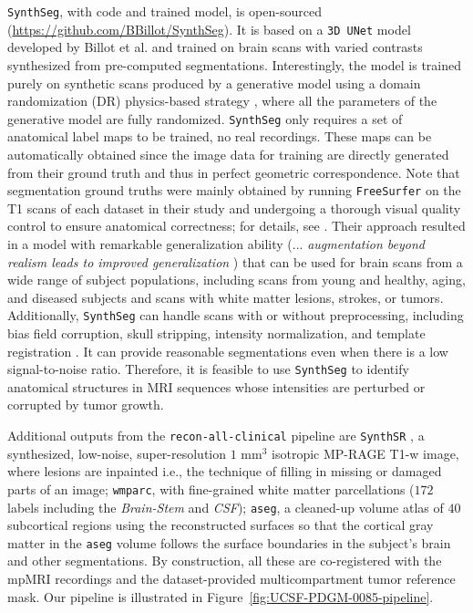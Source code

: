 \documentclass[a4paper,11pt,leqno]{article}
\begin{document}
\texttt{SynthSeg}, with code and trained model, is open-sourced
({\small \url{https://github.com/BBillot/SynthSeg}}). It is based on a \texttt{3D UNet}
model developed by Billot et al. \cite{Billot2020} %
and trained on brain scans with
varied contrasts synthesized from pre-computed segmentations.
Interestingly, the model is trained purely on synthetic scans produced
by a generative model using a domain randomization (DR)
physics-based strategy \cite{Tobin2017}, %
where all the parameters of the generative
model are fully randomized. \texttt{SynthSeg} only requires a set of anatomical
label maps to be trained, no real recordings. These maps can be
automatically obtained since the image data for training are directly
generated from their ground truth and thus in perfect geometric
correspondence. Note that segmentation ground truths were mainly
obtained by running \texttt{FreeSurfer} on the T1 scans of each dataset in their
study and undergoing a thorough visual quality control to ensure
anatomical correctness; for details, see \cite{Billot2023a}. %
Their approach resulted in a model with remarkable generalization
ability (... \emph{augmentation beyond realism leads to improved
generalization} \cite{Bengio2011}) %
that can be used for brain scans
from a wide range of subject populations, including scans from young and
healthy, aging, and diseased subjects and scans with white matter
lesions, strokes, or tumors. Additionally, \texttt{SynthSeg} can handle scans
with or without preprocessing, including bias field corruption, skull
stripping, intensity normalization, and template registration \cite{Billot2023a}.
It can provide reasonable segmentations even when
there is a low signal-to-noise ratio. Therefore, it is feasible to use
\texttt{SynthSeg} to identify anatomical structures in MRI sequences whose
intensities are perturbed or corrupted by tumor growth.

Additional outputs from the \texttt{recon-all-clinical} pipeline are \texttt{SynthSR} %
\cite{Iglesias2023}, a synthesized,
low-noise, super-resolution $1$ mm$^3$ isotropic MP-RAGE T1-w image, where
lesions are inpainted i.e., the technique of filling in missing or damaged parts of an image;
\texttt{wmparc}, with fine-grained white matter parcellations ($172$ labels including the \textit{Brain-Stem} and \textit{CSF});
\texttt{aseg}, a cleaned-up volume atlas of $40$ subcortical regions using the reconstructed
surfaces so that the cortical gray matter in the \texttt{aseg} volume follows the
surface boundaries in the subject's brain and other segmentations. By construction, all
these are co-registered with the mpMRI recordings and the dataset-provided
multicompartment tumor reference mask. Our pipeline is illustrated in
Figure~\ref{fig:UCSF-PDGM-0085-pipeline}.\\
\end{document}
